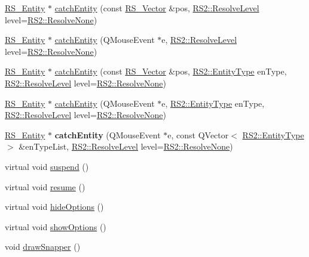\begin{DoxyCompactItemize}
\item 
\hyperlink{classRS__Entity}{R\-S\-\_\-\-Entity} $\ast$ \hyperlink{classRS__Snapper_ac03c56bd45dfadc10260cf361004ee14}{catch\-Entity} (const \hyperlink{classRS__Vector}{R\-S\-\_\-\-Vector} \&pos, \hyperlink{classRS2_a1b2c5e3a3e9d1b03a9564229255faa20}{R\-S2\-::\-Resolve\-Level} level=\hyperlink{classRS2_a1b2c5e3a3e9d1b03a9564229255faa20aecb7396f39bc313ad8903c8a5fac5a50}{R\-S2\-::\-Resolve\-None})
\item 
\hyperlink{classRS__Entity}{R\-S\-\_\-\-Entity} $\ast$ \hyperlink{classRS__Snapper_a2d3d60d49a8e697e28b688a5074deac6}{catch\-Entity} (Q\-Mouse\-Event $\ast$e, \hyperlink{classRS2_a1b2c5e3a3e9d1b03a9564229255faa20}{R\-S2\-::\-Resolve\-Level} level=\hyperlink{classRS2_a1b2c5e3a3e9d1b03a9564229255faa20aecb7396f39bc313ad8903c8a5fac5a50}{R\-S2\-::\-Resolve\-None})
\item 
\hyperlink{classRS__Entity}{R\-S\-\_\-\-Entity} $\ast$ \hyperlink{classRS__Snapper_acf65047858a3a5f54d3bc8acb543f3ff}{catch\-Entity} (const \hyperlink{classRS__Vector}{R\-S\-\_\-\-Vector} \&pos, \hyperlink{classRS2_a8f26d1b981e1e85cff16738b43337e6a}{R\-S2\-::\-Entity\-Type} en\-Type, \hyperlink{classRS2_a1b2c5e3a3e9d1b03a9564229255faa20}{R\-S2\-::\-Resolve\-Level} level=\hyperlink{classRS2_a1b2c5e3a3e9d1b03a9564229255faa20aecb7396f39bc313ad8903c8a5fac5a50}{R\-S2\-::\-Resolve\-None})
\item 
\hyperlink{classRS__Entity}{R\-S\-\_\-\-Entity} $\ast$ \hyperlink{classRS__Snapper_a1e867d5e0eaeea329be09c90a41e3c27}{catch\-Entity} (Q\-Mouse\-Event $\ast$e, \hyperlink{classRS2_a8f26d1b981e1e85cff16738b43337e6a}{R\-S2\-::\-Entity\-Type} en\-Type, \hyperlink{classRS2_a1b2c5e3a3e9d1b03a9564229255faa20}{R\-S2\-::\-Resolve\-Level} level=\hyperlink{classRS2_a1b2c5e3a3e9d1b03a9564229255faa20aecb7396f39bc313ad8903c8a5fac5a50}{R\-S2\-::\-Resolve\-None})
\item 
\hypertarget{classRS__Snapper_a3e985e5dd02af0425b8dd91c5a251206}{\hyperlink{classRS__Entity}{R\-S\-\_\-\-Entity} $\ast$ {\bfseries catch\-Entity} (Q\-Mouse\-Event $\ast$e, const Q\-Vector$<$ \hyperlink{classRS2_a8f26d1b981e1e85cff16738b43337e6a}{R\-S2\-::\-Entity\-Type} $>$ \&en\-Type\-List, \hyperlink{classRS2_a1b2c5e3a3e9d1b03a9564229255faa20}{R\-S2\-::\-Resolve\-Level} level=\hyperlink{classRS2_a1b2c5e3a3e9d1b03a9564229255faa20aecb7396f39bc313ad8903c8a5fac5a50}{R\-S2\-::\-Resolve\-None})}\label{classRS__Snapper_a3e985e5dd02af0425b8dd91c5a251206}

\item 
virtual void \hyperlink{classRS__Snapper_a81b56ba8c01f0ede10850bd4adc7e2df}{suspend} ()
\item 
virtual void \hyperlink{classRS__Snapper_a9c30a8b3f98d2850f1d6f54708fc2d21}{resume} ()
\item 
virtual void \hyperlink{classRS__Snapper_a0601c50cbd651fbb5a954247d19ee565}{hide\-Options} ()
\item 
virtual void \hyperlink{classRS__Snapper_a05f5b1802fd038ef012331607fc94f62}{show\-Options} ()
\item 
void \hyperlink{classRS__Snapper_a8974a8800a1837e2188d80c862e0ee1d}{draw\-Snapper} ()
\end{DoxyCompactItemize}
